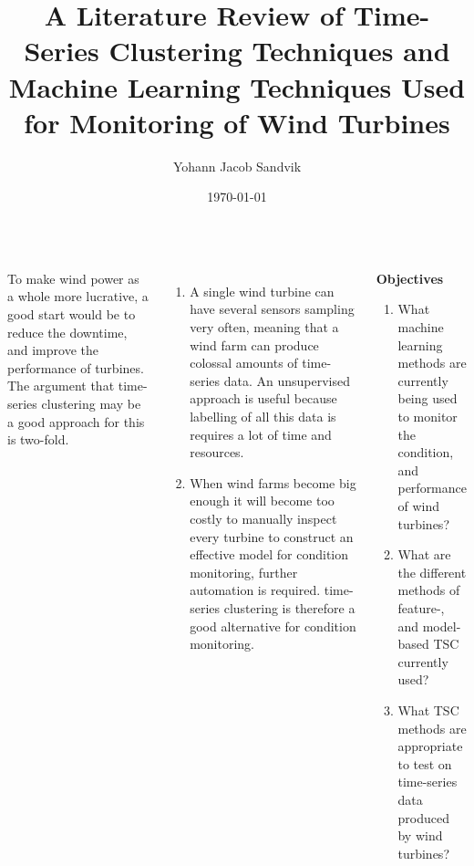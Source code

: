 \documentclass[18pt, a3paper, portrait]{tikzposter}
\title{A Literature Review of Time-Series Clustering Techniques and Machine Learning Techniques Used for Monitoring of Wind Turbines}
\author{Yohann Jacob Sandvik}
\date{\today}
\institute{Institute of Electronic Systems - NTNU}
\begin{document}
 
\maketitle 

\begin{columns}
    {
        To make wind power as a whole more lucrative, a good start would be to reduce the downtime,
        and improve the performance of turbines. The argument that time-series clustering may be a good approach for this is two-fold. \bigskip
        \begin{enumerate}
            \item A single wind turbine can have several sensors sampling very often, meaning that a wind
                farm can produce colossal amounts of time-series data. An unsupervised approach is
                useful because labelling of all this data is requires a lot of time and resources.
            \item When wind farms become big enough it will become too costly to manually inspect every
                turbine to construct an effective model for condition monitoring, further automation is
                required. time-series clustering is therefore a good alternative for condition monitoring.
        \end{enumerate}
    }
 
    {
        \begin{tcolorbox}
            \textbf{Objectives}

            \begin{enumerate}
                \item What machine learning methods are currently being used to monitor the condition, and performance of wind turbines?
                \item What are the different methods of feature-, and model-based TSC currently used?
                \item What TSC methods are appropriate to test on time-series data produced by wind turbines? 
            \end{enumerate}
        \end{tcolorbox}
    }
\end{columns}
 
\end{document}
